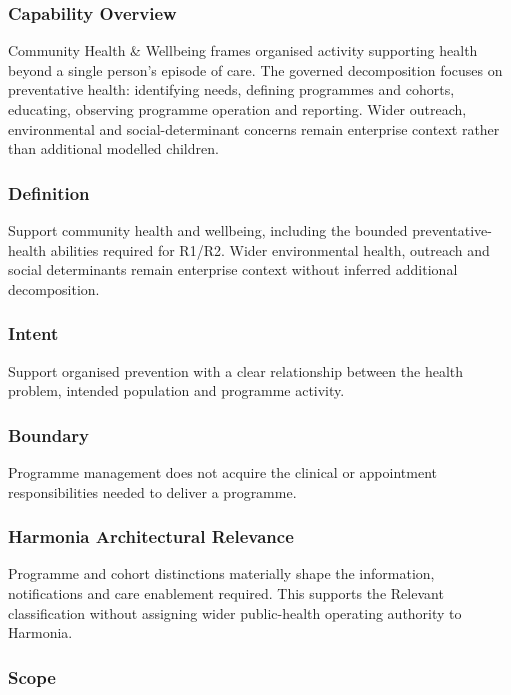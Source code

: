 \subsubsection*{Capability Overview}

Community Health \& Wellbeing frames organised activity supporting health beyond a single person's episode of care. The governed decomposition focuses on preventative health: identifying needs, defining programmes and cohorts, educating, observing programme operation and reporting. Wider outreach, environmental and social-determinant concerns remain enterprise context rather than additional modelled children.

\subsubsection*{Definition}

Support community health and wellbeing, including the bounded preventative-health abilities required for R1/\allowbreak{}R2. Wider environmental health, outreach and social determinants remain enterprise context without inferred additional decomposition.

\subsubsection*{Intent}

Support organised prevention with a clear relationship between the health problem, intended population and programme activity.

\subsubsection*{Boundary}

Programme management does not acquire the clinical or appointment responsibilities needed to deliver a programme.

\subsubsection*{Harmonia Architectural Relevance}

Programme and cohort distinctions materially shape the information, notifications and care enablement required. This supports the Relevant classification without assigning wider public-health operating authority to Harmonia.

\subsubsection*{Scope}
